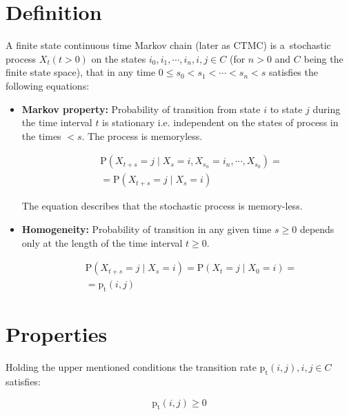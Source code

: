 \documentclass[thesis=M,english]{FITthesis}[2012/10/20]
\begin{document}
\section{Definition}
A finite state continuous time Markov chain (later as CTMC) is a~stochastic process $X_t (t > 0)$ on the states $i_0, i_1, \cdots, i_n, i, j \in C$ (for $n>0$ and $C$ being the finite state space), that in any time $0 \leq s_0 < s_1 < \cdots < s_n < s$ satisfies the following equations: 
\begin{itemize}
\item \textbf{Markov property:} Probability of transition from state $i$ to state $j$ during the time interval $t$ is stationary i.e. independent on the states of process in the times $< s$. The process is memoryless.    
    
\begin{equation}
\begin{aligned}
& \mathrm{P}( X_{t+s} = j \mid X_s = i, X_{s_n} = i_n, \cdots , X_{s_0} ) = \\ 
& = \mathrm{P}( X_{t+s} = j \mid X_s = i )
\end{aligned}
\end{equation}

The equation describes that the stochastic process is memory-less.

\item \textbf{Homogeneity:} Probability of transition in any given time $s \geq 0$ depends only at the length of the time interval $t \geq 0$. 

\begin{equation}
\begin{aligned}
& \mathrm{P}( X_{t+s} = j \mid X_s = i ) = \mathrm{P}( X_t = j \mid X_0 = i ) = \\
& = \mathrm{p_t}(i,j)
\end{aligned}
\end{equation}

\end{itemize}

\section{Properties} 

Holding the upper mentioned conditions the transition rate $\mathrm{p_t}(i,j), i,j \in C$ satisfies:%


\begin{equation}
\mathrm{p_t}(i,j) \geq 0
\end{equation}
\end{document}
